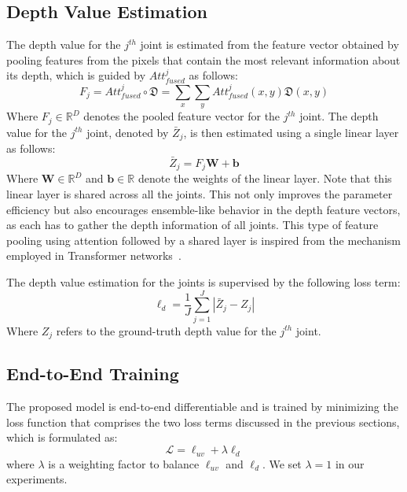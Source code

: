 \documentclass{article}
\begin{document}
\subsection{Depth Value Estimation}
The depth value for the $j^{th}$ joint is estimated from the feature vector obtained by pooling features from the pixels that contain the most relevant information about its depth, which is guided by $Att_{fused}^j$ as follows:
\begin{equation}
  F_j = Att_{fused}^j \circ{\mathfrak{D}} =  \sum_{x}\sum_{y} Att_{fused}^j(x,y) \mathfrak{D}(x,y)
\end{equation}
Where $F_j \in{\mathbb{R}^D}$ denotes the pooled feature vector for the $j^{th}$ joint. The depth value for the $j^{th}$ joint, denoted by $\bar{Z}_j$, is then estimated using a single linear layer as follows:
\begin{equation}
  \bar{Z}_j = F_j \bm{W} + \bm{b}
\end{equation}
Where $\bm{W} \in{\mathbb{R}^{D}}$ and $\bm{b} \in{\mathbb{R}}$ denote the weights of the linear layer. Note that this linear layer is shared across all the joints. This not only improves the parameter efficiency but also encourages ensemble-like behavior in the depth feature vectors, as each has to gather the depth information of all joints. This type of feature pooling using attention followed by a shared layer is inspired from the mechanism employed in Transformer networks~\cite{vaswani2017attention}.
\par
The depth value estimation for the joints is supervised by the following loss term:
\begin{equation}
  \ell_{d} = \frac{1}{J}\sum_{j=1}^J|\bar{Z}_j - Z_j|
\end{equation}
Where $Z_j$ refers to the ground-truth depth value for the $j^{th}$ joint. 

\subsection{End-to-End Training}
The proposed model is end-to-end differentiable and is trained by minimizing the loss function that comprises the two loss terms discussed in the previous sections, which is formulated as:
\begin{equation}
  \mathcal{L} = \ell_{uv} + \lambda \ell_{d}
\end{equation}
where $\lambda$ is a weighting factor to balance $\ell_{uv}$ and $\ell_{d}$. We set  $\lambda = 1$ in our experiments.
\end{document}
